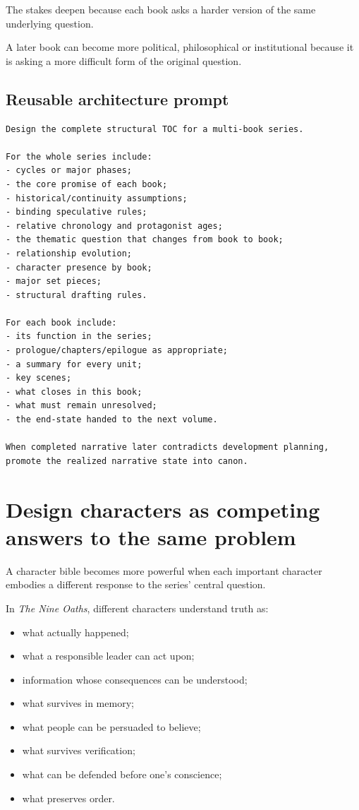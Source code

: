 \documentclass[11pt,oneside,openany]{book}
\providecommand{\tightlist}{%
  \setlength{\itemsep}{0pt}\setlength{\parskip}{0pt}}
\begin{document}
The stakes deepen because each book asks a harder version of the same underlying question.

A later book can become more political, philosophical or institutional because it is asking a more difficult form of the original question.

\section{Reusable architecture prompt}\label{reusable-architecture-prompt}

\begin{lstlisting}
Design the complete structural TOC for a multi-book series.

For the whole series include:
- cycles or major phases;
- the core promise of each book;
- historical/continuity assumptions;
- binding speculative rules;
- relative chronology and protagonist ages;
- the thematic question that changes from book to book;
- relationship evolution;
- character presence by book;
- major set pieces;
- structural drafting rules.

For each book include:
- its function in the series;
- prologue/chapters/epilogue as appropriate;
- a summary for every unit;
- key scenes;
- what closes in this book;
- what must remain unresolved;
- the end-state handed to the next volume.

When completed narrative later contradicts development planning,
promote the realized narrative state into canon.
\end{lstlisting}

\chapter{Design characters as competing answers to the same problem}\label{design-characters-as-competing-answers-to-the-same-problem}

A character bible becomes more powerful when each important character embodies a different response to the series' central question.

In \emph{The Nine Oaths}, different characters understand truth as:

\begin{itemize}
\tightlist
\item
  what actually happened;
\item
  what a responsible leader can act upon;
\item
  information whose consequences can be understood;
\item
  what survives in memory;
\item
  what people can be persuaded to believe;
\item
  what survives verification;
\item
  what can be defended before one's conscience;
\item
  what preserves order.
\end{itemize}
\end{document}
